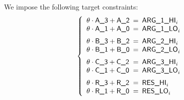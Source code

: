 We impose the following target constraints:
\[
	\left\{ \begin{array}{lcl}
		\theta \cdot \col{A\_3} + \col{A\_2} & \!\!\! = \!\!\! & \argOneHi_{i}              \\
		\theta \cdot \col{A\_1} + \col{A\_0} & \!\!\! = \!\!\! & \argOneLo_{i} \vspace{2mm} \\
		\theta \cdot \col{B\_3} + \col{B\_2} & \!\!\! = \!\!\! & \argTwoHi_{i}              \\
		\theta \cdot \col{B\_1} + \col{B\_0} & \!\!\! = \!\!\! & \argTwoLo_{i} \vspace{2mm} \\
		\theta \cdot \col{C\_3} + \col{C\_2} & \!\!\! = \!\!\! & \argTreHi_{i}              \\
		\theta \cdot \col{C\_1} + \col{C\_0} & \!\!\! = \!\!\! & \argTreLo_{i} \vspace{2mm} \\
		\theta \cdot \col{R\_3} + \col{R\_2} & \!\!\! = \!\!\! & \resHi_{i}                 \\
		\theta \cdot \col{R\_1} + \col{R\_0} & \!\!\! = \!\!\! & \resLo_{i}                 \\
	\end{array} \right.
\]
